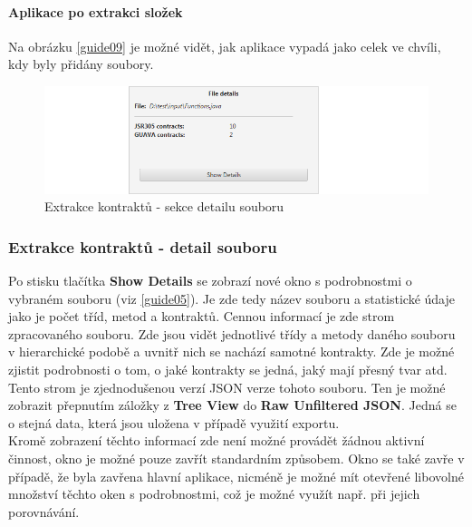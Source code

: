 				\paragraph{Aplikace po extrakci složek}
					Na obrázku \ref{guide09} je možné vidět, jak aplikace vypadá jako celek ve chvíli, kdy byly přidány soubory.
					
					\begin{figure}[!htb]
							\centering
							\includegraphics[width=1\textwidth]{img/guide04.png}
							\caption[guide04]{Extrakce kontraktů - sekce detailu souboru}
							\label{guide04}
						\endminipage\hfill
					\end{figure}					
			
			\subsubsection{Extrakce kontraktů - detail souboru}
				Po stisku tlačítka \textbf{Show Details} se zobrazí nové okno s podrobnostmi o vybraném souboru (viz \ref{guide05}). Je zde tedy název souboru a statistické údaje jako je počet tříd, metod a kontraktů. Cennou informací je zde strom zpracovaného souboru. Zde jsou vidět jednotlivé třídy a metody daného souboru v hierarchické podobě a uvnitř nich se nachází samotné kontrakty. Zde je možné zjistit podrobnosti o tom, o jaké kontrakty se jedná, jaký mají přesný tvar atd. Tento strom je zjednodušenou verzí JSON verze tohoto souboru. Ten je možné zobrazit přepnutím záložky z \textbf{Tree View} do \textbf{Raw Unfiltered JSON}. Jedná se o stejná data, která jsou uložena v případě využití exportu.\\
				
				Kromě zobrazení těchto informací zde není možné provádět žádnou aktivní činnost, okno je možné pouze zavřít standardním způsobem. Okno se také zavře v případě, že byla zavřena hlavní aplikace, nicméně je možné mít otevřené libovolné množství těchto oken s podrobnostmi, což je možné využít např. při jejich porovnávání.
				
